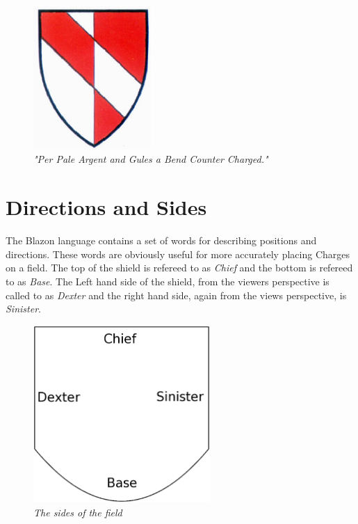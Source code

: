 \begin{figure}[H]
  \centering
    \includegraphics[width=0.4\textwidth]{Blazon/images/countercharged.eps}
  \caption{\emph{"Per Pale Argent and Gules a Bend Counter Charged."\cite{countercharge}}}
  \label{fig:counter}
  
\end{figure}

\section{Directions and Sides}
The Blazon language contains a set of words for describing positions and directions.  These words are obviously useful for more accurately placing Charges on a field.  The top of the shield is refereed to as \emph{Chief} and the bottom is refereed to as \emph{Base}.  The Left hand side of the shield, from the viewers perspective is called to as \emph{Dexter} and the right hand side, again from the views perspective, is \emph{Sinister}. 

\begin{figure}[H]
  \centering
    \includegraphics[width=0.6\textwidth]{Blazon/images/sides.eps}
  \caption{\emph{The sides of the field}}
  
\end{figure}

